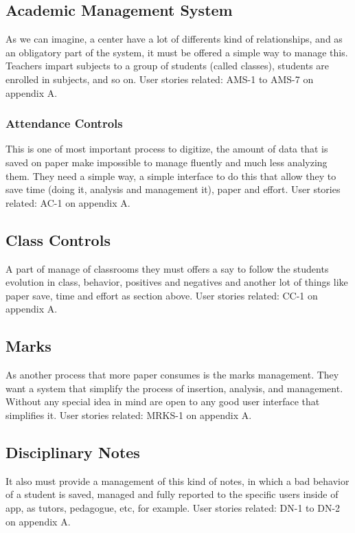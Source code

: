 \subsection{Academic Management System}

As we can imagine, a center have a lot of differents kind of relationships,
and as an obligatory part of the system, it must be offered a simple way to manage this.
Teachers impart subjects to a group of students (called classes), students are
enrolled in subjects, and so on.
\intro
User stories related: AMS-1 to AMS-7 on appendix A.

\subsubsection{Attendance Controls}

This is one of most important process to digitize, the amount of data that is saved on
paper make impossible to manage fluently and much less  analyzing them.
They need a simple way, a simple interface to do this that allow they to save time
(doing it, analysis and management it), paper and effort.
\intro
User stories related: AC-1 on appendix A.

\subsection{Class Controls}

A part of manage of classrooms they must offers a say to follow the students
evolution in class, behavior, positives and negatives and another lot of things
like paper save, time and effort as section above.
\intro
User stories related: CC-1 on appendix A.

\subsection{Marks}

As another process that more paper consumes is the marks management.
They want a system that simplify the process of insertion, analysis, and management.
Without any special idea in mind are open to any good user interface that simplifies it.
\intro
User stories related: MRKS-1 on appendix A.

\subsection{Disciplinary Notes}
It also must provide a management of this kind of notes, in which a bad behavior
of a student is saved, managed and fully reported to the specific users inside of
app, as tutors, pedagogue, etc, for example.
\intro
User stories related: DN-1 to DN-2 on appendix A.

